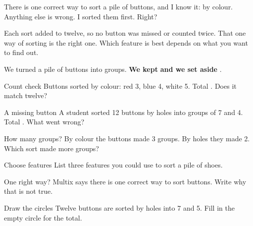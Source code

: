 \begin{multix}[hmm]\multixbot[hmm]\tcblower
There is one correct way to sort a pile of buttons, and I know it: by colour. Anything else is wrong. I sorted them first. Right?
\end{multix}

{Each sort added to twelve, so no button was missed or counted twice.}
{That one way of sorting is the right one. Which feature is best depends on what you want to find out.}

\begin{keepbox}
We turned a pile of buttons into groups. \textbf{We kept} \wline[3.4cm] \textbf{and we set aside} \wline[3.4cm].
\end{keepbox}

\clearpage

\begin{puzzle}{Count check}
Buttons sorted by colour: red 3, blue 4, white 5. Total \wline[1.6cm]. Does it match twelve? \wline[2cm]
\end{puzzle}

\begin{puzzle}{A missing button}
A student sorted 12 buttons by holes into groups of 7 and 4. Total \wline[1.6cm]. What went wrong? \wline[5cm]
\end{puzzle}

\begin{puzzle}{How many groups?}
By colour the buttons made 3 groups. By holes they made 2. Which sort made more groups? \wline[3cm]
\end{puzzle}

\begin{puzzle}{Choose features}
List three features you could use to sort a pile of shoes. \wline[7cm]
\end{puzzle}

\begin{puzzle}{One right way?}
Multix says there is one correct way to sort buttons. Write why that is not true. \wline[6cm]
\end{puzzle}

\clearpage

\begin{puzzle}{Draw the circles}
Twelve buttons are sorted by holes into 7 and 5. Fill in the empty circle for the total.
\begin{center}
\end{center}
\end{puzzle}


